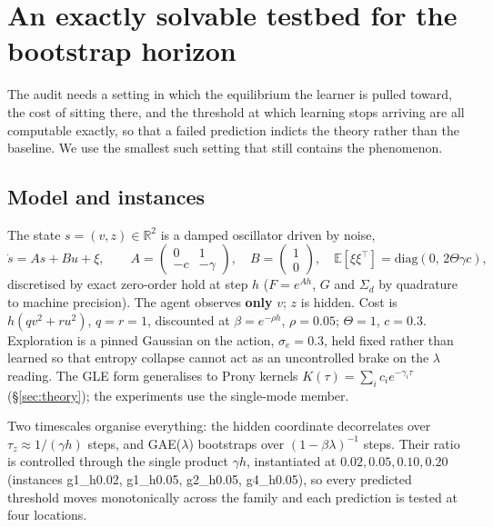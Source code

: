 \section{An exactly solvable testbed for the bootstrap horizon}
\label{sec:testbed}

The audit needs a setting in which the equilibrium the learner is pulled
toward, the cost of sitting there, and the threshold at which learning stops
arriving are all computable exactly, so that a failed prediction indicts the
theory rather than the baseline. We use the smallest such setting that still
contains the phenomenon.

\subsection{Model and instances}

The state $s=(v,z)\in\mathbb{R}^2$ is a damped oscillator driven by noise,
\begin{equation}
\dot s = A s + B u + \xi, \qquad
A = \begin{pmatrix} 0 & 1 \\ -c & -\gamma \end{pmatrix}, \quad
B = \begin{pmatrix} 1 \\ 0 \end{pmatrix}, \quad
\mathbb{E}[\xi \xi^\top] = \mathrm{diag}(0,\, 2\Theta\gamma c),
\label{eq:model}
\end{equation}
discretised by exact zero-order hold at step $h$ ($F=e^{Ah}$, $G$ and
$\Sigma_d$ by quadrature to machine precision). The agent observes
\textbf{only} $v$; $z$ is hidden. Cost is $h(qv^2+ru^2)$, $q=r=1$, discounted
at $\beta=e^{-\rho h}$, $\rho=0.05$; $\Theta=1$, $c=0.3$. Exploration is a
pinned Gaussian on the action, $\sigma_e=0.3$, held fixed rather than learned
so that entropy collapse cannot act as an uncontrolled brake on the
$\lambda$ reading. The GLE form generalises to Prony kernels
$K(\tau)=\sum_i c_i e^{-\gamma_i\tau}$ (\S\ref{sec:theory}); the experiments
use the single-mode member.

Two timescales organise everything: the hidden coordinate decorrelates over
$\tau_z\approx 1/(\gamma h)$ steps, and GAE($\lambda$) bootstraps over
$(1-\beta\lambda)^{-1}$ steps. Their ratio is controlled through the single
product $\gamma h$, instantiated at $0.02, 0.05, 0.10, 0.20$
(instances g1\_h0.02, g1\_h0.05, g2\_h0.05, g4\_h0.05), so every predicted
threshold moves monotonically across the family and each prediction is tested
at four locations.

